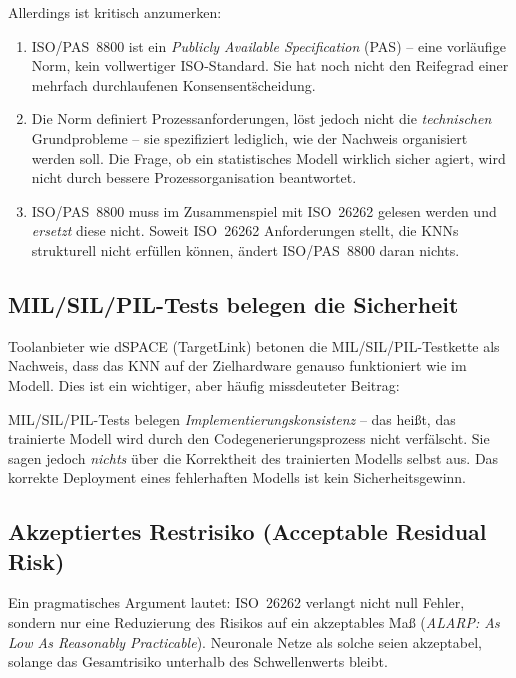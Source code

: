 ﻿\documentclass[12pt,a4paper]{article}
\begin{document}
Allerdings ist kritisch anzumerken:

\begin{enumerate}
  \item ISO/PAS~8800 ist ein \emph{Publicly Available Specification} (PAS) -- eine
    vorl\"aufige Norm, kein vollwertiger ISO-Standard. Sie hat noch nicht den
    Reifegrad einer mehrfach durchlaufenen Konsensent\"scheidung.
  \item Die Norm definiert Prozessanforderungen, l\"ost jedoch nicht die
    \emph{technischen} Grundprobleme -- sie spezifiziert lediglich, wie der
    Nachweis organisiert werden soll. Die Frage, ob ein statistisches Modell
    wirklich sicher agiert, wird nicht durch bessere Prozessorganisation beantwortet.
  \item ISO/PAS~8800 muss im Zusammenspiel mit ISO~26262 gelesen werden und
    \emph{ersetzt} diese nicht. Soweit ISO~26262 Anforderungen stellt, die
    KNNs strukturell nicht erf\"ullen k\"onnen, \"andert ISO/PAS~8800 daran nichts.
\end{enumerate}

\subsection{MIL/SIL/PIL-Tests belegen die Sicherheit}
\label{subsec:gegenarg3}

Toolanbieter wie dSPACE (TargetLink) betonen die MIL/SIL/PIL-Testkette als Nachweis,
dass das KNN auf der Zielhardware genauso funktioniert wie im Modell. Dies ist ein
wichtiger, aber h\"aufig missdeuteter Beitrag:

MIL/SIL/PIL-Tests belegen \emph{Implementierungskonsistenz} -- das hei\ss{}t,
das trainierte Modell wird durch den Codegenerierungsprozess nicht verf\"alscht.
Sie sagen jedoch \emph{nichts} \"uber die Korrektheit des trainierten Modells
selbst aus. Das korrekte Deployment eines fehlerhaften Modells ist kein
Sicherheitsgewinn.

\subsection{Akzeptiertes Restrisiko (Acceptable Residual Risk)}
\label{subsec:gegenarg4}

Ein pragmatisches Argument lautet: ISO~26262 verlangt nicht null Fehler, sondern
nur eine Reduzierung des Risikos auf ein akzeptables Ma\ss{} (\emph{ALARP:
As Low As Reasonably Practicable}). Neuronale Netze als solche seien akzeptabel,
solange das Gesamtrisiko unterhalb des Schwellenwerts bleibt.
\end{document}
